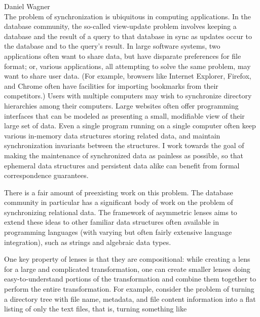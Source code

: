 \documentclass{article}
\begin{document}
{\noindent\large Daniel Wagner}\\[3ex]

The problem of synchronization is ubiquitous in computing applications. In
the database community, the so-called view-update problem involves keeping a
database and the result of a query to that database in sync as updates occur
to the database and to the query's result. In large software systems, two
applications often want to share data, but have disparate preferences for
file format; or, various applications, all attempting to solve the same
problem, may want to share user data. (For example, browsers like Internet
Explorer, Firefox, and Chrome often have facilities for importing bookmarks
from their competitors.) Users with multiple computers may wish to
synchronize directory hierarchies among their computers. Large websites
often offer programming interfaces that can be modeled as presenting a
small, modifiable view of their large set of data. Even a single program
running on a single computer often keep various in-memory data structures
storing related data, and maintain synchronization invariants between the
structures. I work towards the goal of making the maintenance of
synchronized data as painless as possible, so that ephemeral data structures
and persistent data alike can benefit from formal correspondence guarantees.

There is a fair amount of preexisting work on this problem. The database
community in particular has a significant body of work on the problem of
synchronizing relational data. The framework of asymmetric lenses aims to
extend these ideas to other familiar data structures often available in
programming languages (with varying but often fairly extensive language
integration), such as strings and algebraic data types.

One key property of lenses is that they are compositional: while creating a
lens for a large and complicated transformation, one can create smaller
lenses doing easy-to-understand portions of the transformation and combine
them together to perform the entire transformation. For example, consider
the problem of turning a directory tree with file name, metadata, and file
content information into a flat listing of only the text files, that is,
turning something like

\end{document}
